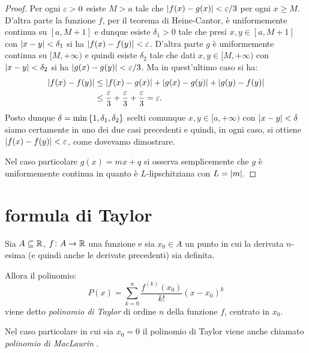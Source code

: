 \begin{proof}
Per ogni $\varepsilon>0$ esiste $M>a$ tale che ${\left|f(x)-g(x)\right|} < \varepsilon/3$ per ogni $x\ge M$. D'altra parte la funzione $f$, per il teorema di Heine-Cantor, è uniformemente continua su $[a,M+1]$ e dunque esiste $\delta_1>0$ tale che presi $x,y \in [a,M+1]$ con ${\left|x-y\right|}< \delta_1$
si ha ${\left|f(x)-f(y)\right|} < \varepsilon$. D'altra parte $g$ è uniformemente continua su $[M,+\infty)$ e quindi esiste $\delta_2$ tale che dati $x,y\in [M,+\infty)$ con ${\left|x-y\right|} < \delta_2$ si ha ${\left|g(x)-g(y)\right|} < \varepsilon/3$. Ma in quest'ultimo caso si ha:
\begin{align*}
  {\left|f(x)-f(y)\right|} &\le {\left|f(x) - g(x)\right|} + {\left|g(x) - g(y)\right|} + {\left|g(y)-f(y)\right|} \\
  & \le \frac{\varepsilon}{3} + \frac{\varepsilon}{3} + \frac{\varepsilon}{3} = \varepsilon.
\end{align*}
Posto dunque $\delta = \min{\left\{ 1, \delta_1, \delta_2 \right\}}$
scelti comunque $x,y\in [a,+\infty)$ con ${\left|x-y\right|}< \delta$ siamo certamente in uno dei due casi precedenti e quindi, in ogni caso, si ottiene ${\left|f(x)-f(y)\right|} < \varepsilon$, come dovevamo dimostrare.

Nel caso particolare $g(x) = mx +q$ si osserva semplicemente che $g$ è uniformemente continua in quanto è $L$-lipschitziana con $L={\left|m\right|}$.
\end{proof}


\section{formula di Taylor}


\begin{definition}
\mymark{***}
Sia $A\subseteq {\mathbb R}$, $f\colon A \to {\mathbb R}$ una funzione
e sia $x_0\in A$ un punto in cui la derivata $n$-esima
(e quindi anche le derivate precedenti) sia definita.

Allora il polinomio:
\[
  P(x) = \sum_{k=0}^n \frac{f^{(k)}(x_0)}{k!}(x-x_0)^k
\]
viene detto \emph{polinomio di Taylor}%
%
di ordine $n$
della funzione $f$,
centrato in $x_0$.
\end{definition}

Nel caso particolare in cui sia $x_0=0$ il polinomio di Taylor viene anche chiamato \emph{polinomio di MacLaurin}%
%
.

